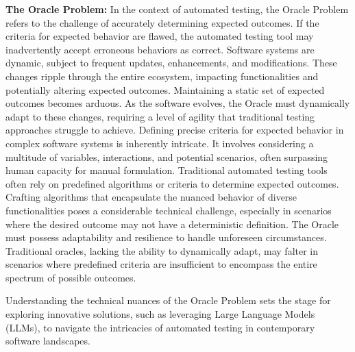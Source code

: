 \textbf{The Oracle Problem:}
In the context of automated testing, the Oracle Problem refers to the challenge of accurately determining expected outcomes. If the criteria for expected behavior are flawed, the automated testing tool may inadvertently accept erroneous behaviors as correct. 
Software systems are dynamic, subject to frequent updates, enhancements, and modifications. These changes ripple through the entire ecosystem, impacting functionalities and potentially altering expected outcomes. Maintaining a static set of expected outcomes becomes arduous. As the software evolves, the Oracle must dynamically adapt to these changes, requiring a level of agility that traditional testing approaches struggle to achieve. Defining precise criteria for expected behavior in complex software systems is inherently intricate. It involves considering a multitude of variables, interactions, and potential scenarios, often surpassing human capacity for manual formulation. Traditional automated testing tools often rely on predefined algorithms or criteria to determine expected outcomes. Crafting algorithms that encapsulate the nuanced behavior of diverse functionalities poses a considerable technical challenge, especially in scenarios where the desired outcome may not have a deterministic definition. The Oracle must possess adaptability and resilience to handle unforeseen circumstances. Traditional oracles, lacking the ability to dynamically adapt, may falter in scenarios where predefined criteria are insufficient to encompass the entire spectrum of possible outcomes\cite{}.

Understanding the technical nuances of the Oracle Problem sets the stage for exploring innovative solutions, such as leveraging Large Language Models (LLMs), to navigate the intricacies of automated testing in contemporary software landscapes.